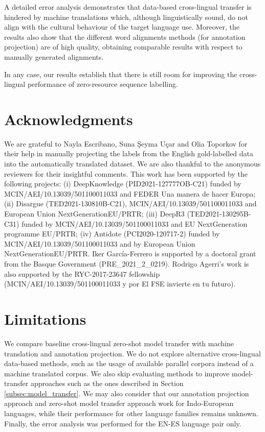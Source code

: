 \documentclass[11pt]{article}
\begin{document}
A detailed error analysis demonstrates that data-based cross-lingual transfer is hindered by machine translations which, although linguistically sound, do not align with the cultural behaviour of the target language use. Moreover, the results also show that the different word alignments methods (for annotation projection) are of high quality, obtaining comparable results with respect to manually generated alignments.





In any case, our results establish that there is still room for improving the cross-lingual performance of zero-resource sequence labelling. 









\section*{Acknowledgments}

We are grateful to Nayla Escribano, Suna Şeyma Uçar and Olia Toporkov for their help in manually projecting the labels from the English gold-labelled data into the automatically translated dataset.
We are also thankful to the anonymous reviewers for their insightful comments. This work has been supported by the following projects: (i) DeepKnowledge (PID2021-127777OB-C21) funded by MCIN/AEI/10.13039/501100011033 and FEDER Una manera de hacer Europa; (ii) Disargue (TED2021-130810B-C21), MCIN/AEI/10.13039/501100011033 and European Union NextGenerationEU/PRTR; (iii) DeepR3 (TED2021-130295B-C31) funded by MCIN/AEI/10.13039/501100011033 and EU NextGeneration programme EU/PRTR; (iv) Antidote (PCI2020-120717-2) funded by MCIN/AEI/10.13039/501100011033 and by European Union NextGenerationEU/PRTR. Iker García-Ferrero is supported by a doctoral grant from the Basque Government (PRE\_2021\_2\_0219). Rodrigo Agerri's work is also supported by the RYC-2017-23647 fellowship (MCIN/AEI/10.13039/501100011033 y por El FSE invierte en tu futuro).

\section*{Limitations}
We compare baseline cross-lingual zero-shot model transfer with machine translation and annotation projection. We do not explore alternative cross-lingual data-based methods, such as the usage of available parallel corpora instead of a machine translated corpus. We also skip evaluating methods to improve model-transfer approaches such as the ones described in Section \ref{subsec:model_transfer}. 
We may also consider that our annotation projection approach and zero-shot model transfer approach work for Indo-European languages, while their performance for other language families remains unknown. Finally, the error analysis was performed for the EN-ES language pair only.
\end{document}
